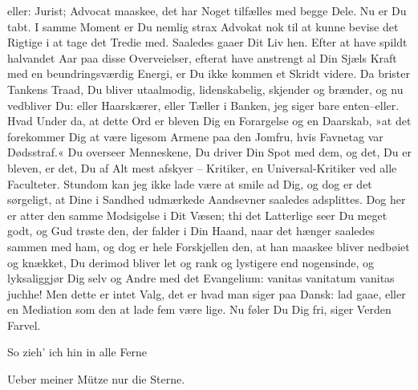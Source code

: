 \documentclass[12pt,a4paper]{article}
\begin{document}
eller: Jurist; Advocat maaskee, det har Noget tilfælles med begge Dele. Nu er Du tabt. I samme Moment er Du nemlig strax Advokat nok til at kunne bevise det Rigtige i at tage det Tredie med. Saaledes gaaer Dit Liv hen. Efter at have spildt halvandet Aar paa disse Overveielser, efterat have anstrengt al Din Sjæls Kraft med en beundringsværdig Energi, er Du ikke kommen et Skridt videre. Da brister Tankens Traad, Du bliver utaalmodig, lidenskabelig, skjender og brænder, og nu vedbliver Du: eller Haarskærer, eller Tæller i Banken, jeg siger bare enten–eller. Hvad Under da, at dette Ord er bleven Dig en Forargelse og en Daarskab, »at det forekommer Dig at være ligesom Armene paa den Jomfru, hvis Favnetag var Dødsstraf.« Du overseer Menneskene, Du driver Din Spot med dem, og det, Du er bleven, er det, Du af Alt mest afskyer – Kritiker, en Universal-Kritiker ved alle Faculteter. Stundom kan jeg ikke lade være at smile ad Dig, og dog er det sørgeligt, at Dine i Sandhed udmærkede Aandsevner saaledes adsplittes. Dog her er atter den samme Modsigelse i Dit Væsen; thi det Latterlige seer Du meget godt, og Gud trøste den, der falder i Din Haand, naar det hænger saaledes sammen med ham, og dog er hele Forskjellen den, at han maaskee bliver nedbøiet og knækket, Du derimod bliver let og rank og lystigere end nogensinde, og lyksaliggjør Dig selv og Andre med det Evangelium: vanitas vanitatum vanitas juchhe! Men dette er intet Valg, det er hvad man siger paa Dansk: lad gaae, eller en Mediation som den at lade fem være lige. Nu føler Du Dig fri, siger Verden Farvel.

So zieh' ich hin in alle Ferne

Ueber meiner Mütze nur die Sterne.
\end{document}
